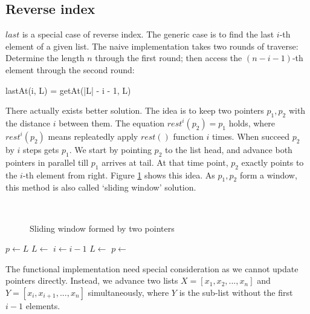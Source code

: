 \documentclass[b5paper]{article}
\begin{document}
\subsection{Reverse index}
 
$last$ is a special case of reverse index. The generic case is to find the last $i$-th element of a given list. The naive implementation takes two rounds of traverse: Determine the length $n$ through the first round; then access the $(n - i - 1)$-th element through the second round:

\be
  lastAt(i, L) = getAt(|L| - i - 1, L)
\ee

There actually exists better solution. The idea is to keep two pointers $p_1, p_2$ with the distance $i$ between them. The equation $rest^i(p_2) = p_1$ holds, where $rest^i(p_2)$ means repleatedly apply $rest()$ function $i$ times. When succeed $p_2$ by $i$ steps gets $p_1$. We start by pointing $p_2$ to the list head, and advance both pointers in parallel till $p_1$ arrives at tail. At that time point, $p_2$ exactly points to the $i$-th element from right. Figure \ref{fig:list-rindex} shows this idea. As $p_1, p_2$ form a window, this method is also called `sliding window' solution.

\begin{figure}[htbp]
  \centering
   \\
  \caption{Sliding window formed by two pointers}
  \label{fig:list-rindex}
\end{figure}

\begin{algorithmic}[1]
  \State $p \gets L$
    \State $L \gets $  
    \State $i \gets i - 1$
  \EndWhile
    \State $L \gets$ 
    \State $p \gets$ 
  \EndWhile
  \State \Return {}
\EndFunction
\end{algorithmic}

The functional implementation need special consideration as we cannot update pointers directly. Instead, we advance two lists $X = [x_1, x_2, ..., x_n]$ and $Y = [x_i, x_{i+1}, ..., x_n]$ simultaneously, where $Y$ is the sub-list without the first $i - 1$ elements.
\end{document}

